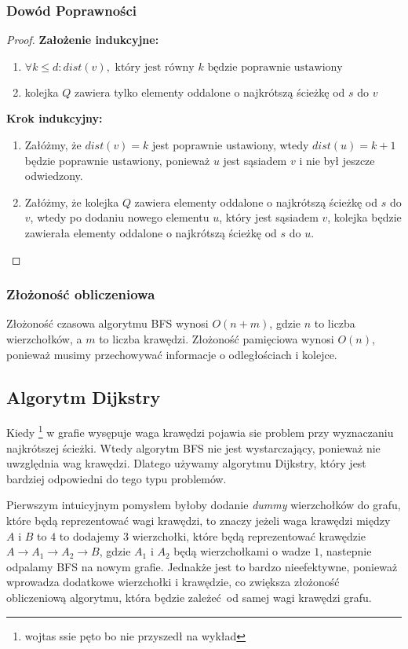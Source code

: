 \documentclass[11pt,a4paper]{article}
\begin{document}
\subsubsection*{Dowód Poprawności}
\begin{proof}
    \textbf{Założenie indukcyjne:}
    \begin{enumerate}
        \item $\forall k\leq d: dist(v),\text{ który jest równy $k$ będzie poprawnie ustawiony}$
        \item kolejka $Q$ zawiera tylko elementy oddalone o najkrótszą ścieżkę od $s$ do $v$
    \end{enumerate}
    \textbf{Krok indukcyjny:}
    \begin{enumerate}
        \item Załóżmy, że $dist(v)=k$ jest poprawnie ustawiony, wtedy $dist(u)=k+1$ będzie poprawnie ustawiony, ponieważ $u$ jest sąsiadem $v$ i nie był jeszcze odwiedzony.
        \item Załóżmy, że kolejka $Q$ zawiera elementy oddalone o najkrótszą ścieżkę od $s$ do $v$, wtedy po dodaniu nowego elementu $u$, który jest sąsiadem $v$, kolejka będzie zawierała elementy oddalone o najkrótszą ścieżkę od $s$ do $u$.
    \end{enumerate}
\end{proof}
\subsubsection*{Złożoność obliczeniowa}
Złożoność czasowa algorytmu BFS wynosi $O(n+m)$, gdzie $n$ to liczba wierzchołków, a $m$ to liczba krawędzi. Złożoność pamięciowa wynosi $O(n)$, ponieważ musimy przechowywać informacje o odległościach i kolejce.

\subsection{Algorytm Dijkstry}
Kiedy \footnote{wojtas ssie pęto bo nie przyszedł na wykład} w grafie wysępuje waga krawędzi pojawia sie problem przy wyznaczaniu najkrótszej ścieżki. Wtedy algorytm BFS nie jest wystarczający, ponieważ nie uwzględnia wag krawędzi. Dlatego używamy algorytmu Dijkstry, który jest bardziej odpowiedni do tego typu problemów.

Pierwszym intuicyjnym pomysłem byłoby dodanie \textit{dummy} wierzchołków do grafu, które będą reprezentować wagi krawędzi, to znaczy jeżeli waga krawędzi między $A$ i $B$ to $4$ to dodajemy $3$ wierzchołki, które będą reprezentować krawędzie $A \to A_1 \to A_2 \to B$, gdzie $A_1$ i $A_2$ będą wierzchołkami o wadze $1$, nastepnie odpalamy BFS na nowym grafie. Jednakże jest to bardzo nieefektywne, ponieważ wprowadza dodatkowe wierzchołki i krawędzie, co zwiększa złożoność obliczeniową algorytmu, która będzie zależeć od samej wagi krawędzi grafu.
\end{document}
